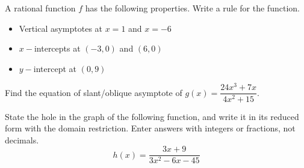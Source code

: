 \documentclass[11pt,addpoints,answers]{exam}
\begin{document}
\begin{questions}
  \vfill
\pagestyle{empty}

\newpage

\question[15] A rational function $f$ has the following properties. Write a rule for the function.

\begin{itemize}
    \item Vertical asymptotes at $x = 1$ and $x = -6$
    \item $x-$intercepts at $(-3,0)$ and $(6,0)$
    \item $y-$intercept at $(0,9)$
\end{itemize}
\vfill
\begin{flushright}\end{flushright}

\question[15]  Find the equation of slant/oblique asymptote of $g(x) = \dfrac{24x^3+7x}{4x^2+15}$.\\

\vfill
\begin{flushright}\end{flushright}


\question[20] State the hole in the graph of the following function, and write it in its reduced form with the domain restriction.  Enter answers with integers or fractions, not decimals.
\[h(x) = \dfrac{3x+9}{3x^2-6x-45}\]

\vfill
\begin{flushright}\end{flushright}
\begin{flushright}\end{flushright}
\begin{flushright}\end{flushright}

\end{questions}

  \vfill
\pagestyle{empty}
\end{document}
